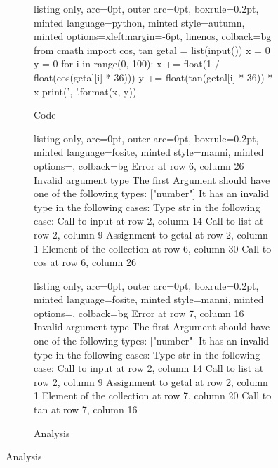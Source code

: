 
\begin{figure}[H]
\caption{Submision 1}
\label{sbm:sub1}
  \begin{subfigure}{\textwidth}
        \caption{Code}
        \label{sbm:sub1_code}

  \begin{tcblisting}{listing only, 
    arc=0pt,
    outer arc=0pt, 
    boxrule=0.2pt,
    minted language=python,
    minted style=autumn,
    minted options={xleftmargin=-6pt, linenos},
    colback=bg }
from cmath import cos, tan
getal = list(input())
x = 0
y = 0
for i in range(0, 100):
    x += float(1 / float(cos(getal[i] * 36)))
    y += float(tan(getal[i] * 36)) * x
print('{}, {}'.format(x, y))
\end{tcblisting}
\end{subfigure}
\begin{subfigure}{\textwidth}
        \caption{Analysis}
        \label{sbm:sub1_anal}
\begin{tcblisting}{listing only, 
    arc=0pt,
    outer arc=0pt, 
    boxrule=0.2pt,
    minted language=fosite,
    minted style=manni,
    minted options={},
    colback=bg }
Error at row 6, column 26
  Invalid argument type
  The first Argument should have one of the following types:
      ["number"]
  It has an invalid type in the following cases:
    Type str in the following case:
      Call to input at row 2, column 14
      Call to list at row 2, column 9
      Assignment to getal at row 2, column 1
      Element of the collection at row 6, column 30
      Call to cos at row 6, column 26
\end{tcblisting}

\begin{tcblisting}{listing only, 
    arc=0pt,
    outer arc=0pt, 
    boxrule=0.2pt,
    minted language=fosite,
    minted style=manni,
    minted options={},
    colback=bg }
Error at row 7, column 16
  Invalid argument type
  The first Argument should have one of the following types:
      ["number"]
  It has an invalid type in the following cases:
    Type str in the following case:
      Call to input at row 2, column 14
      Call to list at row 2, column 9
      Assignment to getal at row 2, column 1
      Element of the collection at row 7, column 20
      Call to tan at row 7, column 16
\end{tcblisting}
\end{subfigure}
\end{figure}

